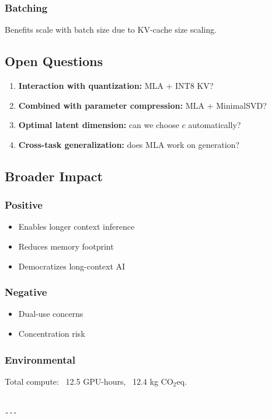 \subsubsection{Batching}
Benefits scale with batch size due to KV-cache size scaling.

\subsection{Open Questions}

\begin{enumerate}
\item \textbf{Interaction with quantization:} MLA + INT8 KV?
\item \textbf{Combined with parameter compression:} MLA + MinimalSVD?
\item \textbf{Optimal latent dimension:} can we choose $c$ automatically?
\item \textbf{Cross-task generalization:} does MLA work on generation?

\end{enumerate}
\subsection{Broader Impact}

\subsubsection{Positive}
\begin{itemize}
\item Enables longer context inference
\item Reduces memory footprint
\item Democratizes long-context AI

\end{itemize}
\subsubsection{Negative}
\begin{itemize}
\item Dual-use concerns
\item Concentration risk

\end{itemize}
\subsubsection{Environmental}
Total compute: ~12.5 GPU-hours, ~12.4 kg CO$_2$eq.
\begin{lstlisting}

---
\end{lstlisting}